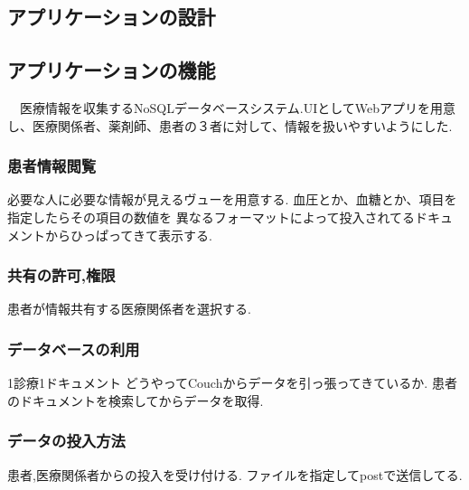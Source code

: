 \subsection{アプリケーションの設計}


\subsection{アプリケーションの機能}
　医療情報を収集するNoSQLデータベースシステム.UIとしてWebアプリを用意し、医療関係者、薬剤師、患者の３者に対して、情報を扱いやすいようにした.

	\subsubsection{患者情報閲覧}
		必要な人に必要な情報が見えるヴューを用意する.
		血圧とか、血糖とか、項目を指定したらその項目の数値を
		異なるフォーマットによって投入されてるドキュメントからひっぱってきて表示する.

	\subsubsection{共有の許可,権限}
		患者が情報共有する医療関係者を選択する.

	\subsubsection{データベースの利用}
		1診療1ドキュメント
		どうやってCouchからデータを引っ張ってきているか.
		患者のドキュメントを検索してからデータを取得.

	\subsubsection{データの投入方法}
		 患者,医療関係者からの投入を受け付ける.
		 ファイルを指定してpostで送信してる.
